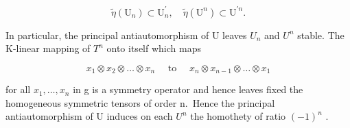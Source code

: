 \[
\tilde {\eta} (\mathrm{U} _ {n}) \subset \mathrm{U} _ {n} ^ {\prime}, \quad \tilde {\eta} (\mathrm{U} ^ {n}) \subset \mathrm{U} ^ {\prime n}.
\]

In particular, the principal antiautomorphism of U leaves \(U_{n}\) and \(U^{n}\) stable. The K-linear mapping of \(T^{n}\) onto itself which maps

\[
x _ {1} \otimes x _ {2} \otimes \dots \otimes x _ {n} \quad \text { to } \quad x _ {n} \otimes x _ {n - 1} \otimes \dots \otimes x _ {1}
\]

for all \(x_{1},\ldots,x_{n}\) in g is a symmetry operator and hence leaves fixed the homogeneous symmetric tensors of order n.~Hence the principal antiautomorphism of U induces on each \(U^{n}\) the homothety of ratio \((-1)^{n}\) .

